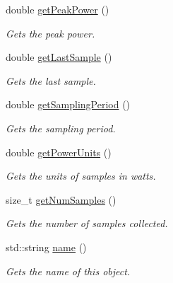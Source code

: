 \begin{DoxyCompactItemize}
double \hyperlink{classxmem_1_1power_1_1_power_reader_ae530d62676bd3b3115815b0f4592a0d6}{get\-Peak\-Power} ()
\begin{DoxyCompactList}\small\item\em Gets the peak power. \end{DoxyCompactList}\item 
double \hyperlink{classxmem_1_1power_1_1_power_reader_a0025b83ec146f206257690ef27323141}{get\-Last\-Sample} ()
\begin{DoxyCompactList}\small\item\em Gets the last sample. \end{DoxyCompactList}\item 
double \hyperlink{classxmem_1_1power_1_1_power_reader_a833084fa298a654a7cf589723483399c}{get\-Sampling\-Period} ()
\begin{DoxyCompactList}\small\item\em Gets the sampling period. \end{DoxyCompactList}\item 
double \hyperlink{classxmem_1_1power_1_1_power_reader_a951b1ddd8a39df60b2668548e7529064}{get\-Power\-Units} ()
\begin{DoxyCompactList}\small\item\em Gets the units of samples in watts. \end{DoxyCompactList}\item 
size\-\_\-t \hyperlink{classxmem_1_1power_1_1_power_reader_af35118b0e7d408679497f84aa0f6397e}{get\-Num\-Samples} ()
\begin{DoxyCompactList}\small\item\em Gets the number of samples collected. \end{DoxyCompactList}\item 
std\-::string \hyperlink{classxmem_1_1power_1_1_power_reader_ac0f465b044512502eb1824f18d60e3e6}{name} ()
\begin{DoxyCompactList}\small\item\em Gets the name of this object. \end{DoxyCompactList}\end{DoxyCompactItemize}

